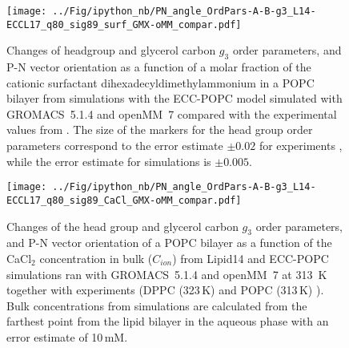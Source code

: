 \documentclass[journal=jpcbfk]{achemso}
\begin{document}
\begin{figure}[!p]
  \centering
  \texttt{[image: ../Fig/ipython\_nb/PN\_angle\_OrdPars-A-B-g3\_L14-ECCL17\_q80\_sig89\_surf\_GMX-oMM\_compar.pdf]}
  \caption{\label{fig:ordPars_surf_GMX_oMM_compar}
    Changes of headgroup and glycerol carbon $g_3$ order parameters, and P-N vector orientation as a function of
    a molar fraction of the cationic surfactant dihexadecyldimethylammonium in a POPC bilayer
    from simulations with the ECC-POPC model
    simulated with GROMACS~5.1.4 \cite{Abraham15} and openMM~7 \cite{openmm7} 
    compared with the experimental values from \cite{scherer89}.
    The size of the markers for the head group order parameters correspond to
    the error estimate $\pm 0.02$ for experiments \cite{botan15,ollila16},
    while the error estimate for simulations is $\pm 0.005$.
  }
\end{figure}

\begin{figure}[!p]
  \centering
  \texttt{[image: ../Fig/ipython\_nb/PN\_angle\_OrdPars-A-B-g3\_L14-ECCL17\_q80\_sig89\_CaCl\_GMX-oMM\_compar.pdf]}
  \caption{\label{fig:ordPars_cacl_GMX_oMM_compar}
    Changes of the head group and glycerol carbon $g_3$ order parameters, and P-N vector orientation of a POPC bilayer 
    as a function of the CaCl$_2$ concentration in bulk ($C_{ion}$)
    from Lipid14 \cite{dickson14} and ECC-POPC simulations ran
    with GROMACS~5.1.4 \cite{Abraham15} and openMM~7 \cite{openmm7} at 313~K
    together with experiments (DPPC (323\,K) \cite{akutsu81} and POPC (313\,K) \cite{altenbach84}). 
    Bulk concentrations from simulations are calculated 
    from the farthest point from the lipid bilayer in the aqueous phase
    with an error estimate of 10\,mM.
  }
\end{figure}



\newpage

\end{document}
